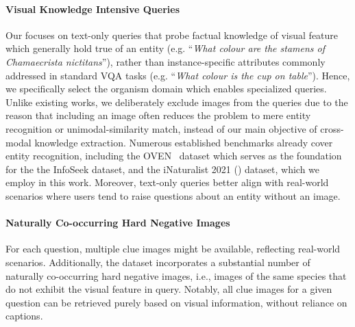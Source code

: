\paragraph{Visual Knowledge Intensive Queries} 
Our \ds focuses on text-only queries that probe factual knowledge of visual feature which generally hold true of an entity (e.g. ``\textit{What colour are the stamens of Chamaecrista nictitans}''), rather than instance-specific attributes commonly addressed in standard VQA tasks (e.g. ``\textit{What colour is the cup on table}''). Hence, we specifically select the organism domain which enables specialized queries. Unlike existing works, we deliberately exclude images from the queries due to the reason that including an image often reduces the problem to mere entity recognition or unimodal-similarity match, instead of our main objective of cross-modal knowledge extraction. Numerous established benchmarks already cover entity recognition, including the OVEN~\citep{Hu_2023_ICCV} dataset which serves as the foundation for the the InfoSeek dataset, and the iNaturalist 2021 (\citealp{Van_Horn_2021_CVPR}) dataset, which we employ in this work. Moreover, text-only queries better align with real-world scenarios where users tend to raise questions about an entity without an image.

\vspace{-0.3em}
\paragraph{Naturally Co-occurring Hard Negative Images} For each question, multiple clue images might be available, reflecting real-world scenarios. Additionally, the dataset incorporates a substantial number of naturally co-occurring hard negative images, i.e., images of the same species that do not exhibit the visual feature in query. Notably, all clue images for a given question can be retrieved purely based on visual information, without reliance on captions.



